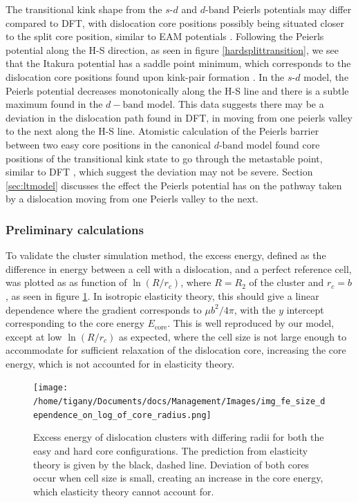 \documentclass[a4paper,11pt]{article}
\numberwithin{equation}{chapter}
\numberwithin{listing}{chapter}
\begin{document}
The transitional kink shape from the \(s\text{-}d\) and \(d\text{-band}\) Peierls
potentials may differ compared to DFT, with dislocation core positions
possibly being situated closer to the split core position, similar to EAM
potentials \cite{Itakura2012,Mendelev2003}. Following the Peierls potential
along the H-S direction, as seen in figure \ref{hardsplittransition}, we see
that the Itakura potential has a saddle point minimum, which corresponds to
the dislocation core positions found upon kink-pair formation
\cite{Itakura2012}. In the \(s\text{-}d\) model, the Peierls potential decreases
monotonically along the H-S line and there is a subtle maximum found in the
\(d-\text{band}\) model. This data suggests there may be a deviation in the
dislocation path found in DFT, in moving from one peierls valley to the next along the H-S line. Atomistic calculation of
the Peierls barrier between two easy core positions in the canonical
\(d\text{-band}\) model found core positions of the transitional kink state to
go through the metastable point, similar to DFT \cite{Simpson2019}, which
suggest the deviation may not be severe. Section \ref{sec:ltmodel} discusses the
effect the Peierls potential has on the pathway taken by a
dislocation moving from one Peierls valley to the next.

\subsubsection{Preliminary calculations}
\label{sec:org3a83b78}


To validate the cluster simulation method, the excess energy, defined as the difference in energy
between a cell with a dislocation, and a perfect reference cell, was plotted as as function of
\(\ln (R/r_c)\), where \(R = R_2\) of the cluster and \(r_c = b\), as seen in
figure \ref{lnrdep}. In isotropic elasticity theory, this should give a linear dependence where the gradient
corresponds to \(\mu b^2 / 4\pi\), with the \(y\) intercept corresponding to the
core energy \(E_{\text{core}}\). This is well reproduced by our model, except at low \(\ln (R/r_c)\)
as expected, where the cell size is not large enough to accommodate for sufficient relaxation of
the dislocation core, increasing the core energy, which is not accounted for in elasticity theory.


\begin{figure}[htbp]
\centering
\texttt{[image: /home/tigany/Documents/docs/Management/Images/img\_fe\_size\_dependence\_on\_log\_of\_core\_radius.png]}
\caption{Excess energy of dislocation clusters with differing radii for both the easy and hard core configurations. The prediction from elasticity theory is given by the black, dashed line. Deviation of both cores occur when cell size is small, creating an increase in the core energy, which elasticity theory cannot account for. \label{lnrdep}}
\end{figure}
\end{document}
